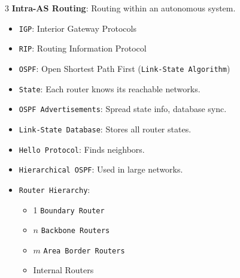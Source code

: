 \documentclass[10pt,landscape]{article}
\begin{document}
\begin{multicols}{3}
\textbf{Intra-AS Routing}: Routing within an autonomous system.
\begin{itemize}
    \setlength{\itemsep}{0pt}
    \item \texttt{IGP}: Interior Gateway Protocols
    \item \texttt{RIP}: Routing Information Protocol
    \item \texttt{OSPF}: Open Shortest Path First (\texttt{Link-State Algorithm})
    \item \texttt{State}: Each router knows its reachable networks.
    \item \texttt{OSPF Advertisements}: Spread state info, database sync.
    \item \texttt{Link-State Database}: Stores all router states.
    \item \texttt{Hello Protocol}: Finds neighbors.
    \item \texttt{Hierarchical OSPF}: Used in large networks.
    \item \texttt{Router Hierarchy}:  
        \begin{itemize}
            \setlength{\itemsep}{0pt}
            \setlength{\itemsep}{0pt}
            \item 1 \texttt{Boundary Router}  
            \item \( n \) \texttt{Backbone Routers}  
            \item \( m \) \texttt{Area Border Routers}  
            \item Internal Routers  
        \end{itemize}
\end{itemize}


\end{multicols}
\end{document}
